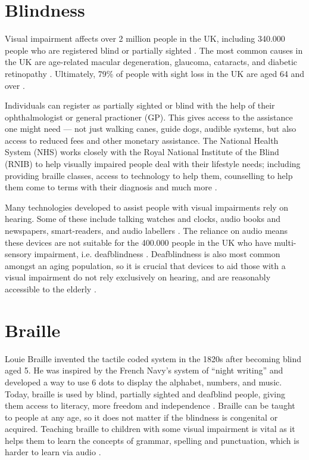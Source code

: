 \section{Blindness}
Visual impairment affects over 2 million people in the UK, including \num{340,000} people who are registered blind or partially sighted \cite{national_health_system_england_blindness_2017}.
The most common causes in the UK are age-related macular degeneration, glaucoma, cataracts, and diabetic retinopathy \cite{fight_for_sight_facts_nodate}.
Ultimately, 79\% of people with sight loss in the UK are aged 64 and over \cite{royal_national_institute_of_blind_people_key_nodate}.

Individuals can register as partially sighted or blind with the help of their ophthalmologist or general practioner (GP).
This gives access to the assistance one might need --- not just walking canes, guide dogs, audible systems, but also access to reduced fees and other monetary assistance.
The National Health System (NHS) works closely with the Royal National Institute of the Blind (RNIB) to help visually impaired people deal with their lifestyle needs; including providing braille classes, access to technology to help them, counselling to help them come to terms with their diagnosis and much more \cite{royal_national_institute_of_blind_people_key_nodate}.

Many technologies developed to assist people with visual impairments rely on hearing.
Some of these include talking watches and clocks, audio books and newspapers, smart-readers, and audio labellers \cite{royal_national_institute_of_blind_people_audio_nodate}. 
The reliance on audio means these devices are not suitable for the \num{400,000} people in the UK who have multi-sensory impairment, i.e. deafblindness \cite{royal_national_institute_of_blind_people_key_nodate}.
Deafblindness is also most common amongst an aging population, so it is crucial that devices to aid those with a visual impairment do not rely exclusively on hearing, and are reasonably accessible to the elderly \cite{sense_deafblindness_nodate,deafblind_uk_what_nodate,national_health_system_england_deafblindness_2017}.  

\section{Braille}
Louie Braille invented the tactile coded system in the 1820s after becoming blind aged 5.
He was inspired by the French Navy's system of ``night writing'' and developed a way to use 6 dots to display the alphabet, numbers, and music.
Today, braille is used by blind, partially sighted and deafblind people, giving them access to literacy, more freedom and independence \cite{sight_scotland_who_nodate}.
Braille can be taught to people at any age, so it does not matter if the blindness is congenital or acquired.
Teaching braille to children with some visual impairment is vital as it helps them to learn the concepts of grammar, spelling and punctuation, which is harder to learn via audio \cite{sight_scotland_what_nodate}.  

